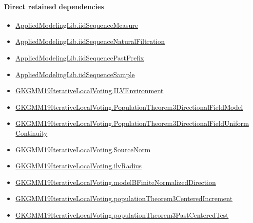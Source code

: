 \documentclass[10pt]{article}
\begin{document}
\paragraph{Direct retained dependencies}
\begin{itemize}\raggedright
\item \hyperlink{governing-declaration-f1b1ee19fc287ae5}{Applied\allowbreak{}Modeling\allowbreak{}Lib.\allowbreak{}iid\allowbreak{}Sequence\allowbreak{}Measure}
\item \hyperlink{governing-declaration-e6e69ddc4ae6dcb6}{Applied\allowbreak{}Modeling\allowbreak{}Lib.\allowbreak{}iid\allowbreak{}Sequence\allowbreak{}Natural\allowbreak{}Filtration}
\item \hyperlink{governing-declaration-4bed61cd5f6d314a}{Applied\allowbreak{}Modeling\allowbreak{}Lib.\allowbreak{}iid\allowbreak{}Sequence\allowbreak{}Past\allowbreak{}Prefix}
\item \hyperlink{governing-declaration-92cd13a68efc3be4}{Applied\allowbreak{}Modeling\allowbreak{}Lib.\allowbreak{}iid\allowbreak{}Sequence\allowbreak{}Sample}
\item \hyperlink{governing-declaration-df2ca62df1846667}{GKGMM19\allowbreak{}Iterative\allowbreak{}Local\allowbreak{}Voting.\allowbreak{}ILV\allowbreak{}Environment}
\item \hyperlink{governing-declaration-30327078fcfa0789}{GKGMM19\allowbreak{}Iterative\allowbreak{}Local\allowbreak{}Voting.\allowbreak{}Population\allowbreak{}Theorem3\allowbreak{}Directional\allowbreak{}Field\allowbreak{}Model}
\item \hyperlink{governing-declaration-d2d3633d4b732b10}{GKGMM19\allowbreak{}Iterative\allowbreak{}Local\allowbreak{}Voting.\allowbreak{}Population\allowbreak{}Theorem3\allowbreak{}Directional\allowbreak{}Field\allowbreak{}Uniform\allowbreak{}Continuity}
\item \hyperlink{governing-declaration-6fa4ab9852321b03}{GKGMM19\allowbreak{}Iterative\allowbreak{}Local\allowbreak{}Voting.\allowbreak{}Source\allowbreak{}Norm}
\item \hyperlink{governing-declaration-2cfd8c76662024e1}{GKGMM19\allowbreak{}Iterative\allowbreak{}Local\allowbreak{}Voting.\allowbreak{}ilv\allowbreak{}Radius}
\item \hyperlink{governing-declaration-20e8ece513543e43}{GKGMM19\allowbreak{}Iterative\allowbreak{}Local\allowbreak{}Voting.\allowbreak{}model\allowbreak{}B\allowbreak{}Finite\allowbreak{}Normalized\allowbreak{}Direction}
\item \hyperlink{governing-declaration-f172e1201669c9b1}{GKGMM19\allowbreak{}Iterative\allowbreak{}Local\allowbreak{}Voting.\allowbreak{}population\allowbreak{}Theorem3\allowbreak{}Centered\allowbreak{}Increment}
\item \hyperlink{governing-declaration-89bada5391f7da9a}{GKGMM19\allowbreak{}Iterative\allowbreak{}Local\allowbreak{}Voting.\allowbreak{}population\allowbreak{}Theorem3\allowbreak{}Past\allowbreak{}Centered\allowbreak{}Test}
\end{itemize}
\hypertarget{governing-declaration-56b43b29b0757532}{}
\end{document}

